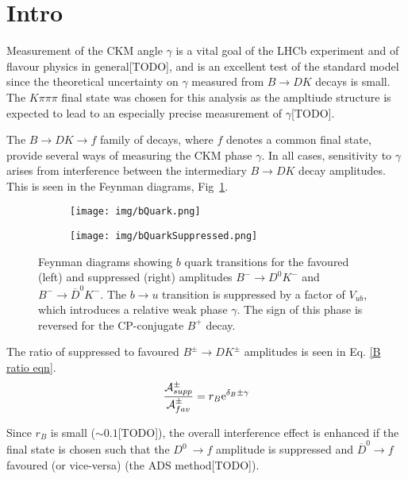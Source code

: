 \documentclass[note.tex]{subfiles}
\begin{document}
\section{Intro}
Measurement of the CKM angle $\gamma$ is a vital goal of the LHCb experiment and of flavour physics in general[TODO],
and is an excellent test of the standard model since the theoretical uncertainty on $\gamma$ measured from $B\rightarrow DK$ decays is small.
The $K\pi\pi\pi$ final state was chosen for this analysis as the ampltiude structure is expected to lead to an especially precise measurement of $\gamma$[TODO].

The $B \rightarrow DK \rightarrow f$ family of decays, where $f$ denotes a common final state,
provide several ways of measuring the CKM phase $\gamma$. In all cases, sensitivity to
$\gamma$ arises from interference between the intermediary $B \rightarrow DK$ decay amplitudes.
This is seen in the Feynman diagrams, Fig~\ref{fig:bucs}.

\begin{figure}[htb!]
    \begin{subfigure}[t]{0.5\linewidth}
        \centering
        \texttt{[image: img/bQuark.png]}
    \end{subfigure}
    \begin{subfigure}[t]{0.5\linewidth}
        \centering
        \texttt{[image: img/bQuarkSuppressed.png]}
    \end{subfigure}
    \caption{Feynman diagrams showing $b$ quark transitions for the favoured (left) and suppressed (right) amplitudes $B^-\rightarrow D^0 K^-$ and $B^-\rightarrow \overline{D}^0 K^-$.
        The $b\rightarrow u$ transition is suppressed by a factor of $V_{ub}$, which introduces a relative weak phase $\gamma$.
        The sign of this phase is reversed for the CP-conjugate $B^+$ decay.}
    \label{fig:bucs}
\end{figure}

The ratio of suppressed to favoured $B^\pm \rightarrow DK^\pm$ amplitudes is seen in Eq. \ref{B ratio eqn}.
\begin{equation}
    \label{B ratio eqn}
    \frac{\mathcal{A}^\pm_{supp}}{\mathcal{A}^\pm_{fav}}= r_B{\rm e}^{\delta_B \pm \gamma}
\end{equation}

Since $r_B$ is small ($\sim 0.1$[TODO]), the overall interference effect is enhanced if the final state is chosen such that the $D^0\
    \rightarrow f$ amplitude is suppressed and $\overline{D}^0\rightarrow f$ favoured (or vice-versa) (the ADS method[TODO]).
\end{document}
